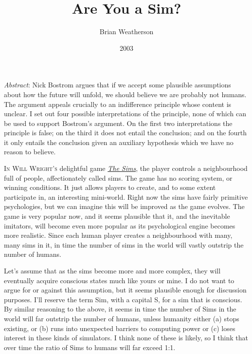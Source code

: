 \documentclass[
  11pt,
  letterpaper,
  DIV=11,
  numbers=noendperiod,
  twoside]{scrartcl}
\title{Are You a Sim?}
\author{Brian Weatherson}
\date{2003}
\newcounter{none} %
\renewenvironment{abstract}
 {\vspace{-1.25cm}
 \quotation\small\noindent\emph{Abstract}:}
 {\endquotation}
\renewenvironment{abstract}
 {\quotation\small\noindent\emph{Abstract}:}
 {\endquotation\vspace{-0.02cm}}
\begin{document}
\maketitle
\begin{abstract}
Nick Bostrom argues that if we accept some plausible assumptions about
how the future will unfold, we should believe we are probably not
humans. The argument appeals crucially to an indifference principle
whose content is unclear. I set out four possible interpretations of the
principle, none of which can be used to support Bostrom's argument. On
the first two interpretations the principle is false; on the third it
does not entail the conclusion; and on the fourth it only entails the
conclusion given an auxiliary hypothesis which we have no reason to
believe.
\end{abstract}


\lettrine{I}{n Will Wright's} delightful game
\href{https://web.archive.org/web/20030525123719/http://thesims.ea.com/}{\emph{The
Sims}}, the player controls a neighbourhood full of people,
affectionately called sims. The game has no scoring system, or winning
conditions. It just allows players to create, and to some extent
participate in, an interesting mini-world. Right now the sims have
fairly primitive psychologies, but we can imagine this will be improved
as the game evolves. The game is very popular now, and it seems
plausible that it, and the inevitable imitators, will become even more
popular as its psychological engine becomes more realistic. Since each
human player creates a neighbourhood with many, many sims in it, in time
the number of sims in the world will vastly outstrip the number of
humans.

Let's assume that as the sims become more and more complex, they will
eventually acquire conscious states much like yours or mine. I do not
want to argue for or against this assumption, but it seems plausible
enough for discussion purposes. I'll reserve the term Sim, with a
capital S, for a sim that is conscious. By similar reasoning to the
above, it seems in time the number of Sims in the world will far
outstrip the number of humans, unless humanity either (a) stops
existing, or (b) runs into unexpected barriers to computing power or (c)
loses interest in these kinds of simulators. I think none of these is
likely, so I think that over time the ratio of Sims to humans will far
exceed 1:1.
\end{document}

